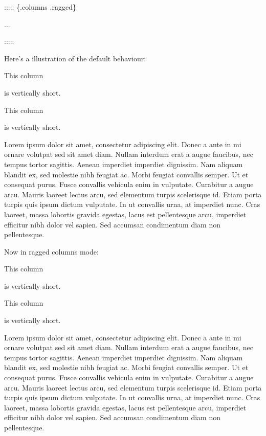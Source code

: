 \documentclass[
]{article}
\newenvironment{Shaded}{}{}
\newcommand{\NormalTok}[1]{#1}
\begin{document}
\begin{Shaded}
\begin{Highlighting}[]
\NormalTok{::::: \{.columns .ragged\}}

\NormalTok{...}

\NormalTok{:::::}
\end{Highlighting}
\end{Shaded}

Here's a illustration of the default behaviour:

{\begin{multicols}{4}

This column

is vertically short.

\columnbreak

This column

is vertically short.

\columnbreak

\columnbreak

Lorem ipsum dolor sit amet, consectetur adipiscing elit. Donec a ante in
mi ornare volutpat sed sit amet diam. Nullam interdum erat a augue
faucibus, nec tempus tortor sagittis. Aenean imperdiet imperdiet
dignissim. Nam aliquam blandit ex, sed molestie nibh feugiat ac. Morbi
feugiat convallis semper. Ut et consequat purus. Fusce convallis
vehicula enim in vulputate. Curabitur a augue arcu. Mauris laoreet
lectus arcu, sed elementum turpis scelerisque id. Etiam porta turpis
quis ipsum dictum vulputate. In ut convallis urna, at imperdiet nunc.
Cras laoreet, massa lobortis gravida egestas, lacus est pellentesque
arcu, imperdiet efficitur nibh dolor vel sapien. Sed accumsan
condimentum diam non pellentesque.

\end{multicols}
}

Now in ragged columns mode:

{\raggedcolumns\begin{multicols}{4}

This column

is vertically short.

\columnbreak

This column

is vertically short.

\columnbreak

\columnbreak

Lorem ipsum dolor sit amet, consectetur adipiscing elit. Donec a ante in
mi ornare volutpat sed sit amet diam. Nullam interdum erat a augue
faucibus, nec tempus tortor sagittis. Aenean imperdiet imperdiet
dignissim. Nam aliquam blandit ex, sed molestie nibh feugiat ac. Morbi
feugiat convallis semper. Ut et consequat purus. Fusce convallis
vehicula enim in vulputate. Curabitur a augue arcu. Mauris laoreet
lectus arcu, sed elementum turpis scelerisque id. Etiam porta turpis
quis ipsum dictum vulputate. In ut convallis urna, at imperdiet nunc.
Cras laoreet, massa lobortis gravida egestas, lacus est pellentesque
arcu, imperdiet efficitur nibh dolor vel sapien. Sed accumsan
condimentum diam non pellentesque.

\end{multicols}
}
\end{document}

